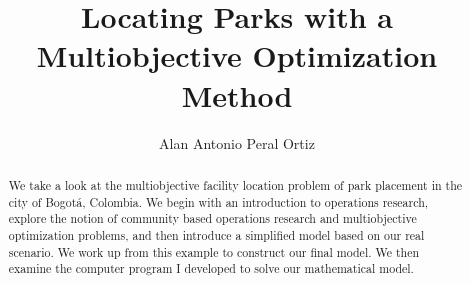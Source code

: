 \documentclass[12pt]{pom_thesis}
\author{Alan Antonio Peral Ortiz}
\title{Locating Parks with a Multiobjective Optimization Method}
\theoremstyle{definition}
\begin{document}


\maketitle

\begin{abstract}We take a look at the multiobjective facility location problem of park placement in the city of Bogot\'{a}, Colombia. We begin with an introduction to operations research, explore the notion of community based operations research and multiobjective optimization problems, and then introduce a simplified model based on our real scenario. We work up from this example to construct our final model. We then examine the computer program I developed to solve our mathematical model.
\end{abstract}
\end{document}

